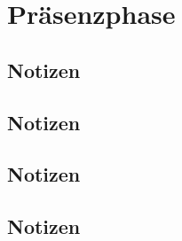 \chapter{Präsenzphase}



\clearpage
\newpage
\section*{Notizen}
\newpage



\clearpage
\newpage
\section*{Notizen}
\newpage



\clearpage
\newpage
\section*{Notizen}
\newpage



\clearpage
\newpage
\section*{Notizen}
\newpage